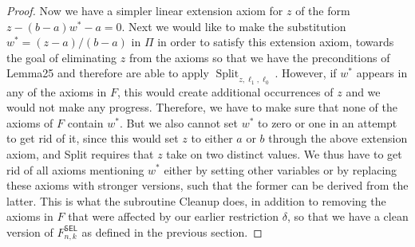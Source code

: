 \documentclass[10pt,a4paper]{article}
\DeclareMathOperator{\Split}{Split}
\begin{document}
\begin{proof}
Now we have a simpler linear extension axiom for $z$ of the form $z-(b-a)w^*-a=0$. Next we would like to make the substitution $w^*=(z-a)/(b-a)$ in $\Pi$ in order to satisfy this extension axiom, towards the goal of eliminating $z$ from the axioms so that we have the preconditions of Lemma25 and therefore are able to apply $\Split_{z,\ell_1,\ell_0}$. However, if $w^*$ appears in any of the axioms in $F$, this would create additional occurrences of $z$ and we would not make any progress. Therefore, we have to make sure that none of the axioms of $F$ contain $w^*$. But we also cannot set $w^*$ to zero or one in an attempt to get rid of it, since this would set $z$ to either $a$ or $b$ through the above extension axiom, and Split requires that $z$ take on two distinct values. We thus have to get rid of all axioms mentioning $w^*$ either by setting other variables or by replacing these axioms with stronger versions, such that the former can be derived from the latter. This is what the subroutine Cleanup does, in addition to removing the axioms in $F$ that were affected by our earlier restriction $\delta$, so that we have a clean version of $F^{\mathsf{SEL}}_{n,k}$ as defined in the previous section.

\end{proof}
\end{document}
